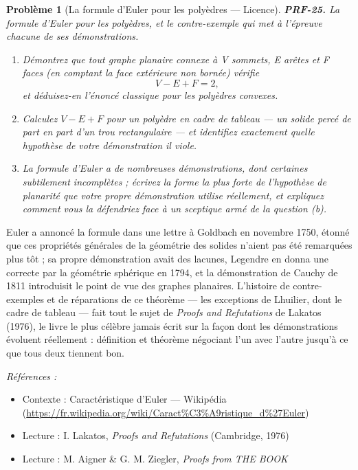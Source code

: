 \documentclass[11pt]{article}
\newtheorem{problem}{Problème}
\newenvironment{refs}{\par\small\noindent\emph{Références :}\begin{itemize}\setlength\itemsep{0pt}}{\end{itemize}\normalsize}
\begin{document}
\begin{problem}[{La formule d'Euler pour les polyèdres --- Licence}]
\textbf{PRF-25.} La formule d'Euler pour les polyèdres, et le contre-exemple qui met à
l'épreuve chacune de ses démonstrations.
\begin{enumerate}
\item[(a)] Démontrez que tout graphe planaire connexe à V
sommets, E arêtes et F faces (en comptant la face extérieure non bornée) vérifie
\[ V - E + F = 2, \]
et déduisez-en l'énoncé classique pour les polyèdres convexes.
\item[(b)] Calculez $ V - E + F $
pour un polyèdre en \og{} cadre de tableau \fg{} --- un solide percé de part en part d'un trou
rectangulaire --- et identifiez exactement quelle hypothèse de votre démonstration il
viole.
\item[(c)] La formule d'Euler a de
nombreuses démonstrations, dont certaines subtilement incomplètes ; écrivez la forme la plus
forte de l'hypothèse de planarité que votre propre démonstration utilise réellement, et
expliquez comment vous la défendriez face à un sceptique armé de la question (b).
\end{enumerate}

\end{problem}

\noindent Euler a annoncé la formule dans une lettre à Goldbach en novembre 1750,
étonné que \og{} ces propriétés générales de la géométrie des solides n'aient pas été remarquées
plus tôt \fg{} ; sa propre démonstration avait des lacunes, Legendre en donna une correcte par la
géométrie sphérique en 1794, et la démonstration de Cauchy de 1811 introduisit le point de vue
des graphes planaires. L'histoire de contre-exemples et de réparations de ce théorème --- les
exceptions de Lhuilier, dont le cadre de tableau --- fait tout le sujet de \textit{Proofs and
Refutations} de Lakatos (1976), le livre le plus célèbre jamais écrit sur la façon dont
les démonstrations évoluent réellement : définition et théorème négociant l'un avec l'autre
jusqu'à ce que tous deux tiennent bon.

\begin{refs}
\item Contexte : Caractéristique d'Euler --- Wikipédia (\url{https://fr.wikipedia.org/wiki/Caract%C3%A9ristique_d%27Euler})
\item Lecture : I. Lakatos, \textit{Proofs and Refutations} (Cambridge, 1976)
\item Lecture : M. Aigner \& G. M. Ziegler, \textit{Proofs from THE BOOK}
\end{refs}
\end{document}

